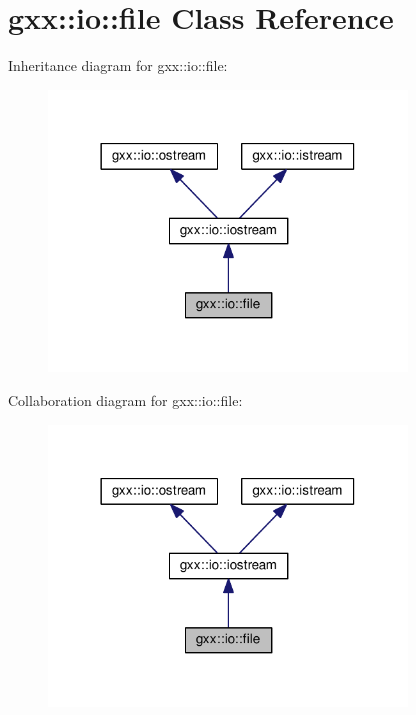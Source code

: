 \hypertarget{classgxx_1_1io_1_1file}{}\section{gxx\+:\+:io\+:\+:file Class Reference}
\label{classgxx_1_1io_1_1file}


Inheritance diagram for gxx\+:\+:io\+:\+:file\+:
\nopagebreak
\begin{figure}[H]
\begin{center}
\leavevmode
\includegraphics[width=270pt]{classgxx_1_1io_1_1file__inherit__graph}
\end{center}
\end{figure}


Collaboration diagram for gxx\+:\+:io\+:\+:file\+:
\nopagebreak
\begin{figure}[H]
\begin{center}
\leavevmode
\includegraphics[width=270pt]{classgxx_1_1io_1_1file__coll__graph}
\end{center}
\end{figure}
